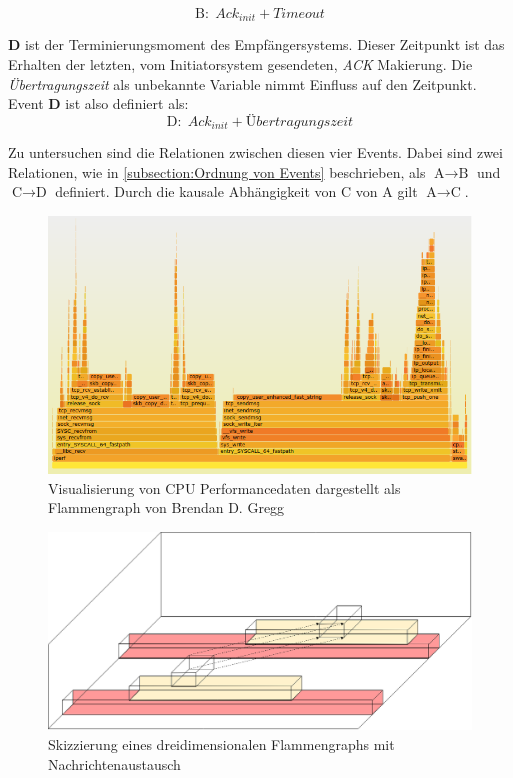 \[
	\text{B}: \; Ack_{init} + Timeout  
\]

 \textbf{D} ist der Terminierungsmoment des Empfängersystems. Dieser Zeitpunkt ist das Erhalten der letzten, vom Initiatorsystem gesendeten, \emph{ACK} Makierung. Die \emph{Übertragungszeit} als unbekannte Variable nimmt Einfluss auf den Zeitpunkt. Event \textbf{D} ist also definiert als:
 \[
 \text{D}: \; Ack_{init} + Übertragungszeit 
 \]
 
 Zu untersuchen sind die Relationen zwischen diesen vier Events.
 Dabei sind zwei Relationen, wie in \cref{subsection:Ordnung von Events} beschrieben, als $\text{A}\rightarrow\text{B}$ und $\text{C}\rightarrow\text{D}$ definiert. Durch die kausale Abhängigkeit von $\text{C}$ von $\text{A}$ gilt $\text{A}\rightarrow\text{C}$.

 \begin{figure}[!ht]
	\centering
	\includegraphics[scale=0.5]{img/Problembeschreibung/problembeschreibung_flamengraph.png}
	\caption[Visualisierung von CPU Performancedaten]{Visualisierung von CPU Performancedaten dargestellt als Flammengraph von Brendan D. Gregg \cite{BrendanGregg2011}}
	\label{fig:problembeschreibung_flamengraph}
\end{figure}

\begin{figure}[!ht]
	\centering
	\includegraphics[scale=0.3]{img/Problembeschreibung/flamegraph_3D.png}
	\caption[3D Flammengraph]{Skizzierung eines dreidimensionalen Flammengraphs mit Nachrichtenaustausch}
	\label{fig:flamegraph_3D}
\end{figure}

